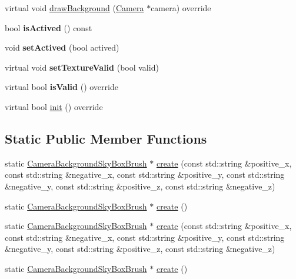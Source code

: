 \begin{DoxyCompactItemize}
virtual void \hyperlink{classCameraBackgroundSkyBoxBrush_ac7f69194164c51712f6b2d556ce795c7}{draw\+Background} (\hyperlink{classCamera}{Camera} $\ast$camera) override
\item 
\mbox{\label{classCameraBackgroundSkyBoxBrush_a8182d27b033168e109f12ebaaed2adc2}} 
bool {\bfseries is\+Actived} () const
\item 
\mbox{\label{classCameraBackgroundSkyBoxBrush_a7031969f3cc1368c813f2488bbbc4784}} 
void {\bfseries set\+Actived} (bool actived)
\item 
\mbox{\label{classCameraBackgroundSkyBoxBrush_a6189ac875f34a3c7583a7ae77214d3f7}} 
virtual void {\bfseries set\+Texture\+Valid} (bool valid)
\item 
\mbox{\label{classCameraBackgroundSkyBoxBrush_a4f43c32c73d500ce13818d14e78601d4}} 
virtual bool {\bfseries is\+Valid} () override
\item 
virtual bool \hyperlink{classCameraBackgroundSkyBoxBrush_a64ccd3e968b8a907d72b82aaa354b4ca}{init} () override
\end{DoxyCompactItemize}
\subsection*{Static Public Member Functions}
\begin{DoxyCompactItemize}
\item 
static \hyperlink{classCameraBackgroundSkyBoxBrush}{Camera\+Background\+Sky\+Box\+Brush} $\ast$ \hyperlink{classCameraBackgroundSkyBoxBrush_ae2e5e6ebefef131e1b4cb96d56be118e}{create} (const std\+::string \&positive\+\_\+x, const std\+::string \&negative\+\_\+x, const std\+::string \&positive\+\_\+y, const std\+::string \&negative\+\_\+y, const std\+::string \&positive\+\_\+z, const std\+::string \&negative\+\_\+z)
\item 
static \hyperlink{classCameraBackgroundSkyBoxBrush}{Camera\+Background\+Sky\+Box\+Brush} $\ast$ \hyperlink{classCameraBackgroundSkyBoxBrush_a4be8f2ab6c86a0372a36a8201c6decb7}{create} ()
\item 
static \hyperlink{classCameraBackgroundSkyBoxBrush}{Camera\+Background\+Sky\+Box\+Brush} $\ast$ \hyperlink{classCameraBackgroundSkyBoxBrush_ab1cbf3862135b9c8a2333c2e2293e467}{create} (const std\+::string \&positive\+\_\+x, const std\+::string \&negative\+\_\+x, const std\+::string \&positive\+\_\+y, const std\+::string \&negative\+\_\+y, const std\+::string \&positive\+\_\+z, const std\+::string \&negative\+\_\+z)
\item 
static \hyperlink{classCameraBackgroundSkyBoxBrush}{Camera\+Background\+Sky\+Box\+Brush} $\ast$ \hyperlink{classCameraBackgroundSkyBoxBrush_a5d45171d49e22f0af5e709458db20364}{create} ()
\end{DoxyCompactItemize}

